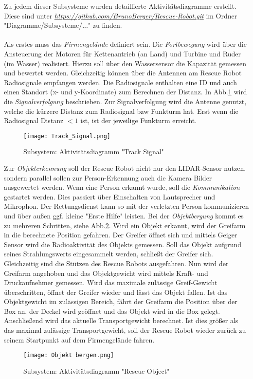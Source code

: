 Zu jedem dieser Subsysteme wurden detaillierte Aktivitätsdiagramme erstellt. Diese sind unter \textit{\url{https://github.com/BrunoBerger/Rescue-Robot.git}} im Ordner "Diagramme/Subsysteme/..." zu finden.\\ 
\\
Als erstes muss das \textit{Firmengelände} definiert sein. Die \textit{Fortbewegung} wird über die Ansteuerung der Motoren für Kettenantrieb (an Land) und Turbine und Ruder (im Wasser) realisiert. Hierzu soll über den Wassersensor die Kapazität gemessen und bewertet werden. Gleichzeitig können über die Antennen am Rescue Robot Radiosignale empfangen werden. Die Radiosignale enthalten eine ID und auch einen Standort (x- und y-Koordinate) zum Berechnen der Distanz. In Abb.\ref{Track_Signal} wird die \textit{Signalverfolgung} beschrieben. Zur Signalverfolgung wird die Antenne genutzt, welche die kürzere Distanz zum Radiosignal bzw Funkturm hat. Erst wenn die Radiosignal Distanz $<1$ ist, ist der jeweilige Funkturm erreicht.

\begin{figure}[H]
  \centering\texttt{[image: Track\_Signal.png]}
  \caption{Subsystem: Aktivitätsdiagramm "Track Signal"}
  \label{Track_Signal}
\end{figure}

Zur \textit{Objekterkennung} soll der Rescue Robot nicht nur den LIDAR-Sensor nutzen, sondern parallel sollen zur Person-Erkennung auch die Kamera Bilder ausgewertet werden. Wenn eine Person erkannt wurde, soll die \textit{Kommunikation} gestartet werden. Dies passiert über Einschalten von Lautsprecher und Mikrophon. Der Rettungsdienst kann so mit der verletzten Person kommunizieren und über außen ggf. kleine "Erste Hilfe" leisten. Bei der \textit{Objektbergung} kommt es zu mehreren Schritten, siehe Abb.\ref{Rescue_object}. Wird ein Objekt erkannt, wird der Greifarm in die berechnete Position gefahren. Der Greifer öffnet sich und mittels Geiger Sensor wird die Radioaktivität des Objekts gemessen. Soll das Objekt aufgrund seines Strahlungswerts eingesammelt werden, schließt der Greifer sich. Gleichzeitig sind die Stützen des Rescue Robots ausgefahren. Nun wird der Greifarm angehoben und das Objektgewicht wird mittels Kraft- und Druckaufnehmer gemessen. Wird das maximale zulässige  Greif-Gewicht überschritten, öffnet der Greifer wieder und lässt das Objekt fallen. Ist das Objektgewicht im zulässigen Bereich, fährt der Greifarm die Position über der Box an, der Deckel wird geöffnet und das Objekt wird in die Box gelegt. Anschließend wird das aktuelle Transportgewicht berechnet. Ist dies größer als das maximal zulässige Transportgewicht, soll der Rescue Robot wieder zurück zu seinem Startpunkt auf dem Firmengelände fahren.

\begin{figure}[H]
  \centering\texttt{[image: Objekt bergen.png]}
  \caption{Subsystem: Aktivitätsdiagramm "Rescue Object"}
  \label{Rescue_object}
\end{figure}